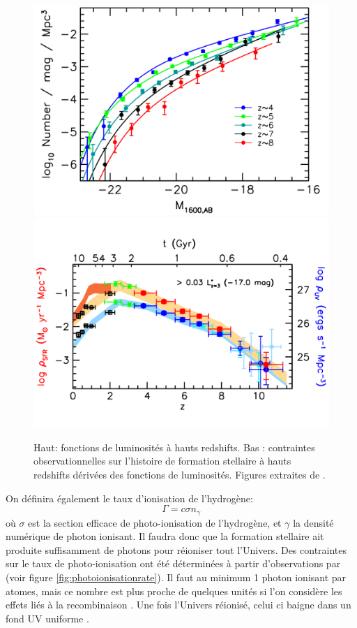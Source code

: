 \begin{figure}
		\includegraphics[width=.95\linewidth]{img/01/UV_lum_obs.pdf} 
        \includegraphics[width=.95\linewidth]{img/01/SFR_obs.pdf} 
        \caption[Contrainte SFH]{Haut: fonctions de luminosités à hauts redshifts. 
        Bas : contraintes observationnelles sur l'histoire de formation stellaire à hauts redshifts dérivées des fonctions de luminosités. 
        Figures extraites de \cite{bouwens_reionization_2015}.
 		\label{fig:obs}}
\end{figure}


On définira également le taux d'ionisation de l'hydrogène:
\begin{equation}
\Gamma = c \sigma n_\gamma
\end{equation}
où $\sigma$ est la section efficace de photo-ionisation de l'hydrogène, et $\gamma$ la densité numérique de photon ionisant.
Il faudra donc que la formation stellaire ait produite suffisamment de photons pour réioniser tout l'Univers.
Des contraintes sur le taux de photo-ionisation ont été déterminées à partir d'observations par \cite{2013MNRAS.436.1023B} (voir figure \ref{fig:photoionisationrate}).
Il faut au minimum 1 photon ionisant par atomes, mais ce nombre est plus proche de quelques unités si l'on considère les effets liés à la recombinaison \citep{aubert_reionization_2010}.
Une fois l'Univers réionisé, celui ci baigne dans un fond UV uniforme \citep{haardt_radiative_2012}.


